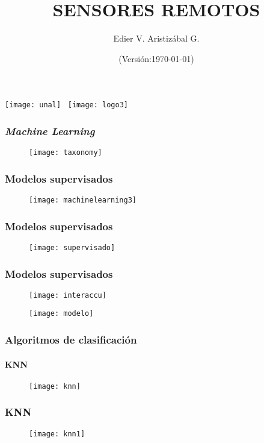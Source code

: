 \documentclass[14pt]{beamer}
\title[Clasificación de Imágenes]{SENSORES REMOTOS}
\author[Edier Aristizábal]{Edier V. Aristizábal G.}
\institute{\emph{evaristizabalg@unal.edu.co}}
\date{\tiny{(Versión:\today)}}
\begin{document}
\begin{frame}
\titlepage
\centering
	\texttt{[image: unal]}\hspace*{4.75cm}~%
   	\texttt{[image: logo3]}
\end{frame}
 \begin{frame}
 \frametitle{\emph{Machine Learning}}
  \begin{figure}
    \centering
    \texttt{[image: taxonomy]}
  \end{figure}
\end{frame}
 \begin{frame}
 \frametitle{Modelos supervisados}
  \begin{figure}
    \centering
    \texttt{[image: machinelearning3]}
  \end{figure}
\end{frame}
 \begin{frame}
 \frametitle{Modelos supervisados}
  \begin{figure}
    \centering
    \texttt{[image: supervisado]}
  \end{figure}
\end{frame}
 \begin{frame}
 \frametitle{Modelos supervisados}
  \begin{figure}
    \centering
    \texttt{[image: interaccu]}
  \end{figure}
\end{frame}
\begin{frame}
  \begin{figure}
    \centering
    \texttt{[image: modelo]}
  \end{figure}
\end{frame}
\begin{frame}
\frametitle{Algoritmos de clasificación}
\framesubtitle{KNN}
  \begin{figure}
    \centering
    \texttt{[image: knn]}
   \end{figure}
\end{frame}
\begin{frame}
\frametitle{KNN}
  \begin{figure}
    \centering
    \texttt{[image: knn1]}
   \end{figure}
\end{frame}
\end{document}

